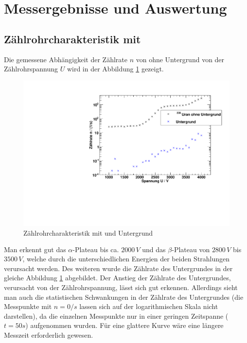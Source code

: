 \section{Messergebnisse und Auswertung}

\subsection{Zählrohrcharakteristik mit \uran}
Die gemessene Abhängigkeit der Zählrate $n$ von \uran ohne Untergrund von der Zählrohrspannung $U$ wird in der Abbildung \ref{img:char:uran} gezeigt.
\begin{figure}[H]
\begin{center}
  \includegraphics[width=15cm]{../img/Uran238_Charakteristik.pdf}
  \caption[Zählrohrcharakteristik mit \uran]{Zählrohrcharakteristik mit \uran und Untergrund}
  \label{img:char:uran}
\end{center}
\end{figure}
Man erkennt gut das $\alpha$-Plateau bis ca. $2000\,V$ und das $\beta$-Plateau von $2800\,V$ bis $3500\,V$, welche durch die 
unterschiedlichen Energien der beiden Strahlungen verursacht werden. Des weiteren wurde die Zählrate des Untergrundes in der gleiche Abbildung 
\ref{img:char:uran} abgebildet. Der Anstieg der Zählrate des Untergrundes, verursacht von der Zählrohrspannung, lässt sich gut erkennen. Allerdings 
sieht man auch die statistischen Schwankungen in der Zählrate des Untergrundes (die Messpunkte mit $n = 0 / s$ lassen sich auf der logarithmischen 
Skala nicht darstellen), da die einzelnen Messpunkte nur in einer geringen Zeitspanne ($t=50s$) aufgenommen wurden. Für eine glattere Kurve wäre 
eine längere Messzeit erforderlich gewesen.

